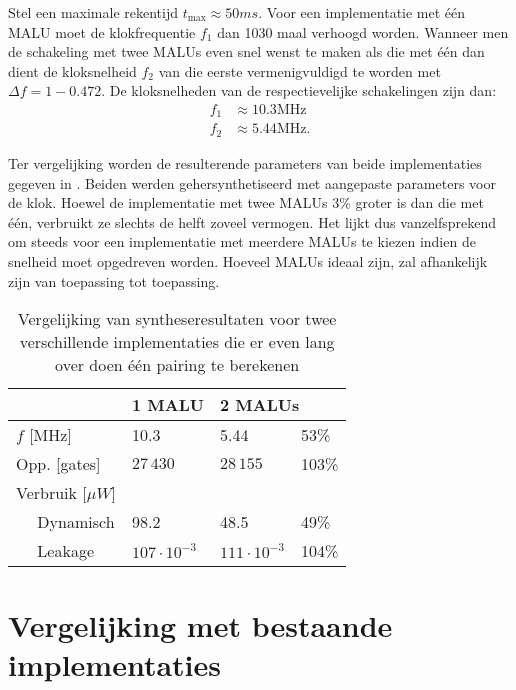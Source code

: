 Stel een maximale rekentijd $t_{\text{max}} \approx 50ms$. Voor een implementatie met \'e\'en MALU moet de klokfrequentie $f_1$ dan 1030 maal verhoogd worden. Wanneer men de schakeling met twee MALUs even snel wenst te maken als die met \'e\'en dan dient de kloksnelheid $f_2$ van die eerste vermenigvuldigd te worden met $\Delta f = 1 - 0.472$.
De kloksnelheden van de respectievelijke schakelingen zijn dan:
\[\begin{aligned}
f_1	&\approx 10.3\text{MHz}\\
f_2	&\approx 5.44\text{MHz}.
\end{aligned}\]

Ter vergelijking worden de resulterende parameters van beide implementaties gegeven in . Beiden werden gehersynthetiseerd met aangepaste parameters voor de klok. Hoewel de implementatie met twee MALUs 3\% groter is dan die met \'e\'en, verbruikt ze slechts de helft zoveel vermogen. Het lijkt dus vanzelfsprekend om steeds voor een implementatie met meerdere MALUs te kiezen indien de snelheid moet opgedreven worden. Hoeveel MALUs ideaal zijn, zal afhankelijk zijn van toepassing tot toepassing.

\begin{table}[h]
	\caption{Vergelijking van syntheseresultaten voor twee verschillende implementaties die er even lang over doen \'e\'en pairing te berekenen}
	\label{tabel-resultaten-m1-vs-m2}

	\centering
	\begin{tabular}{lll@{$\;\;$}l}
		\toprule
		& 1 MALU	& \multicolumn{2}{l}{2 MALUs}\\
		\midrule
		$f$ [MHz]					& 10.3						& 5.44						& 53\% \\ 
		Opp. [gates]				& $27\,430$					& $28\,155$					& 103\% \\
		Verbruik [$\mu W$]		& 								& 								& \\
		$\quad$ Dynamisch			& 98.2						& 48.5						& 49\% \\
		$\quad$ Leakage			& $107 \cdot 10^{-3}$	& $111 \cdot 10^{-3}$	& 104\% \\
		\bottomrule	
	\end{tabular}
\end{table}

\section{Vergelijking met bestaande implementaties}

